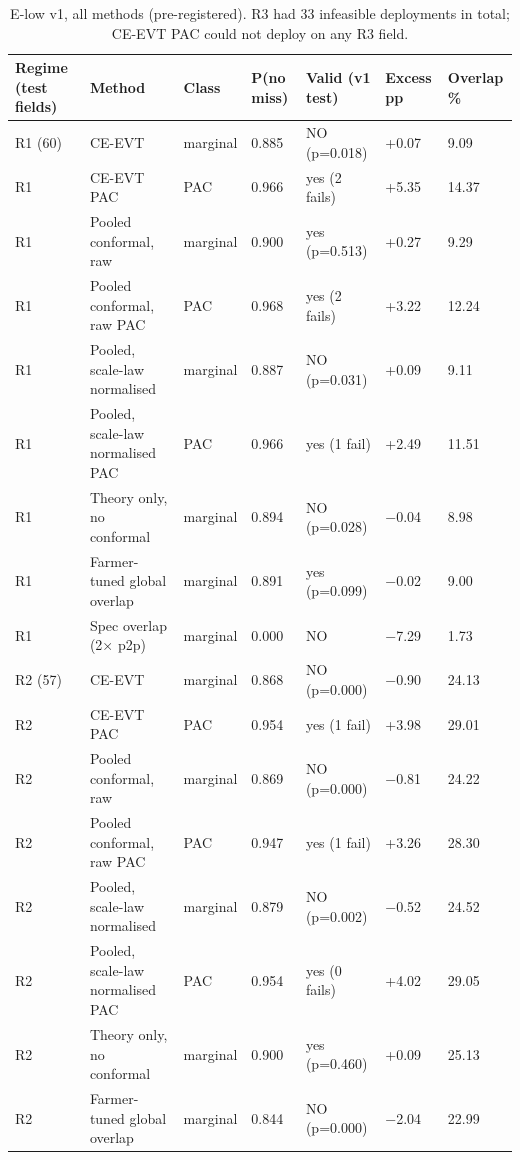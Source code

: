 \documentclass[preprint,12pt,authoryear]{elsarticle}
\begin{document}
\begin{table}[!htbp]
\centering
\footnotesize
\renewcommand{\thetable}{S6}\caption{E-low v1, all methods (pre-registered). R3 had 33 infeasible deployments in total; CE-EVT PAC could not deploy on any R3 field.}
\begin{tabularx}{\textwidth}{@{}>{\raggedright\arraybackslash\hsize=0.70\hsize}X>{\raggedright\arraybackslash\hsize=1.60\hsize}Xll>{\raggedright\arraybackslash\hsize=0.70\hsize}Xll@{}}
\toprule
\textbf{Regime (test fields)} & \textbf{Method} & \textbf{Class} & \textbf{P(no miss)} & \textbf{Valid (v1 test)} & \textbf{Excess pp} & \textbf{Overlap \%} \\
\midrule
R1 (60) & CE-EVT & marginal & 0.885 & NO (p=0.018) & +0.07 & 9.09 \\
R1 & CE-EVT PAC & PAC & 0.966 & yes (2 fails) & +5.35 & 14.37 \\
R1 & Pooled conformal, raw & marginal & 0.900 & yes (p=0.513) & +0.27 & 9.29 \\
R1 & Pooled conformal, raw PAC & PAC & 0.968 & yes (2 fails) & +3.22 & 12.24 \\
R1 & Pooled, scale-law normalised & marginal & 0.887 & NO (p=0.031) & +0.09 & 9.11 \\
R1 & Pooled, scale-law normalised PAC & PAC & 0.966 & yes (1 fail) & +2.49 & 11.51 \\
R1 & Theory only, no conformal & marginal & 0.894 & NO (p=0.028) & −0.04 & 8.98 \\
R1 & Farmer-tuned global overlap & marginal & 0.891 & yes (p=0.099) & −0.02 & 9.00 \\
R1 & Spec overlap (2× p2p) & marginal & 0.000 & NO & −7.29 & 1.73 \\
R2 (57) & CE-EVT & marginal & 0.868 & NO (p=0.000) & −0.90 & 24.13 \\
R2 & CE-EVT PAC & PAC & 0.954 & yes (1 fail) & +3.98 & 29.01 \\
R2 & Pooled conformal, raw & marginal & 0.869 & NO (p=0.000) & −0.81 & 24.22 \\
R2 & Pooled conformal, raw PAC & PAC & 0.947 & yes (1 fail) & +3.26 & 28.30 \\
R2 & Pooled, scale-law normalised & marginal & 0.879 & NO (p=0.002) & −0.52 & 24.52 \\
R2 & Pooled, scale-law normalised PAC & PAC & 0.954 & yes (0 fails) & +4.02 & 29.05 \\
R2 & Theory only, no conformal & marginal & 0.900 & yes (p=0.460) & +0.09 & 25.13 \\
R2 & Farmer-tuned global overlap & marginal & 0.844 & NO (p=0.000) & −2.04 & 22.99 \\

\end{tabularx}
\end{table}
\end{document}
